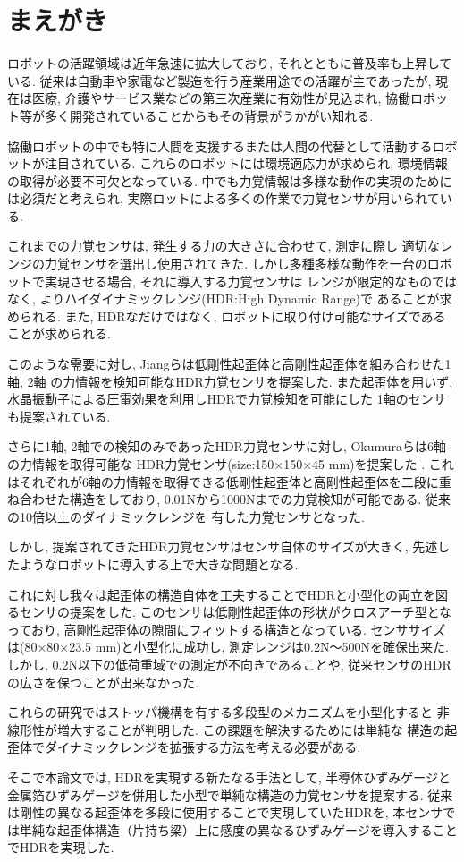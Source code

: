 \section{まえがき} 
ロボットの活躍領域は近年急速に拡大しており, 
それとともに普及率も上昇している. 
従来は自動車や家電など製造を行う産業用途での活躍が主であったが, 
現在は医療, 介護やサービス業などの第三次産業に有効性が見込まれ, 
協働ロボット等が多く開発されていることからもその背景がうかがい知れる.

協働ロボットの中でも特に人間を支援するまたは人間の代替として活動するロボットが注目されている. 
これらのロボットには環境適応力が求められ, 環境情報の取得が必要不可欠となっている.
中でも力覚情報は多様な動作の実現のためには必須だと考えられ, 
実際ロットによる多くの作業で力覚センサが用いられている\cite{blumenkranz2018force}\cite{Berkman2003}\cite{Bouyarmane2019}\cite{Jacq2019}\cite{yokoo2012}.

これまでの力覚センサは, 発生する力の大きさに合わせて, 測定に際し
適切なレンジの力覚センサを選出し使用されてきた. 
しかし多種多様な動作を一台のロボットで実現させる場合, それに導入する力覚センサは
レンジが限定的なものではなく, よりハイダイナミックレンジ(HDR:High Dynamic Range)で
あることが求められる. 
また, HDRなだけではなく, ロボットに取り付け可能なサイズであることが求められる. 

このような需要に対し, Jiangらは低剛性起歪体と高剛性起歪体を組み合わせた1軸\cite{Jiang2015}, 2軸\cite{jiang2013}
の力情報を検知可能なHDR力覚センサを提案した. 
また起歪体を用いず, 水晶振動子による圧電効果を利用しHDRで力覚検知を可能にした
1軸のセンサも提案されている\cite{murozaki2014miniaturized}.

さらに1軸, 2軸での検知のみであったHDR力覚センサに対し, Okumuraらは6軸の力情報を取得可能な
HDR力覚センサ(size:150×150×45 mm)を提案した\cite{okumura2018high} \cite{Okumura}. 
これはそれぞれが6軸の力情報を取得できる低剛性起歪体と高剛性起歪体を二段に重ね合わせた構造をしており, 
0.01Nから1000Nまでの力覚検知が可能である. 従来の10倍以上のダイナミックレンジを
有した力覚センサとなった. 

しかし, 提案されてきたHDR力覚センサはセンサ自体のサイズが大きく, 
先述したようなロボットに導入する上で大きな問題となる.

これに対し我々は起歪体の構造自体を工夫することでHDRと小型化の両立を図るセンサ\cite{Ryuya}の提案をした. 
このセンサは低剛性起歪体の形状がクロスアーチ型となっており, 
高剛性起歪体の隙間にフィットする構造となっている. 
センササイズは(80×80×23.5 mm)と小型化に成功し, 
測定レンジは0.2N～500Nを確保出来た.
しかし, 0.2N以下の低荷重域での測定が不向きであることや, 
従来センサのHDRの広さを保つことが出来なかった. 

これらの研究ではストッパ機構を有する多段型のメカニズムを小型化すると
非線形性が増大することが判明した. この課題を解決するためには単純な
構造の起歪体でダイナミックレンジを拡張する方法を考える必要がある. 

そこで本論文では, HDRを実現する新たなる手法として, 半導体ひずみゲージと
金属箔ひずみゲージを併用した小型で単純な構造の力覚センサを提案する. 
従来は剛性の異なる起歪体を多段に使用することで実現していたHDRを, 
本センサでは単純な起歪体構造（片持ち梁）上に感度の異なるひずみゲージを導入することでHDRを実現した. 
